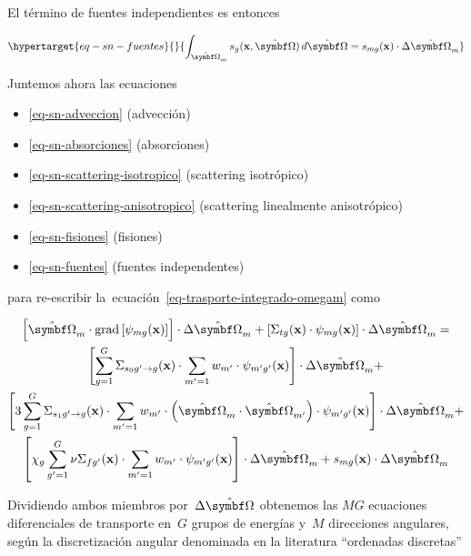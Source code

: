 \documentclass[
  12pt,
  a4paper,
  table]{scrbook}
\providecommand{\tightlist}{%
  \setlength{\itemsep}{0pt}\setlength{\parskip}{0pt}}\usepackage{longtable,booktabs,array}
\theoremstyle{plain}
\theoremstyle{definition}
\theoremstyle{plain}
\theoremstyle{plain}
\theoremstyle{remark}
\begin{document}
El término de fuentes independientes es entonces

\begin{equation}\protect\hypertarget{eq-sn-fuentes}{}{
\int_{\omegaversor_m} s_g(\vec{x}, \omegaversor) \, d\omegaversor
=
s_{mg}(\vec{x}) \cdot \Delta \omegaversor_m
}\label{eq-sn-fuentes}\end{equation}

Juntemos ahora las ecuaciones

\begin{itemize}
\tightlist
\item
  \ref{eq-sn-adveccion} (advección)
\item
  \ref{eq-sn-absorciones} (absorciones)
\item
  \ref{eq-sn-scattering-isotropico}
  (\foreignlanguage{american}{scattering} isotrópico)
\item
  \ref{eq-sn-scattering-anisotropico}
  (\foreignlanguage{american}{scattering} linealmente anisotrópico)
\item
  \ref{eq-sn-fisiones} (fisiones)
\item
  \ref{eq-sn-fuentes} (fuentes independentes)
\end{itemize}

para re-escribir la~ecuación~\ref{eq-trasporte-integrado-omegam} como

\[
\begin{gathered}
\left[ \omegaversor_m \cdot \text{grad} \left[ \psi_{mg}(\vec{x}) \right] \right]  \cdot \Delta \omegaversor_m +
\left[ \Sigma_{t g}(\vec{x}) \cdot \psi_{mg}(\vec{x}) \right] \cdot \Delta \omegaversor_m = \\
\left[ \sum_{g=1}^G \Sigma_{s_0 g^\prime \rightarrow g}(\vec{x})  \cdot \sum_{m^\prime=1} w_{m^\prime} \cdot \psi_{m^\prime g^\prime}(\vec{x}) \right] \cdot \Delta \omegaversor_m + \\
\left[ 3 \sum_{g=1}^G \Sigma_{s_1 g^\prime \rightarrow g}(\vec{x}) \cdot \sum_{m^\prime=1} w_{m^\prime} \cdot \left( \omegaversor_{m} \cdot \omegaversor_{m^\prime} \right) \cdot \psi_{m^\prime g^\prime}(\vec{x}) \right] \cdot  \Delta \omegaversor_m + \\
\left[ \chi_g \sum_{g^\prime=1}^G \nu\Sigma_{fg^\prime}(\vec{x}) \cdot   \sum_{m^\prime=1} w_{m^\prime} \cdot \psi_{m^\prime g^\prime}(\vec{x}) \right] \cdot \Delta \omegaversor_m + 
s_{mg}(\vec{x}) \cdot \Delta \omegaversor_m
\end{gathered}
\]

Dividiendo ambos miembros por~\(\Delta \omegaversor\) obtenemos las
\(MG\) ecuaciones diferenciales de transporte en~\(G\) grupos de
energías y~\(M\) direcciones angulares, según la discretización angular
denominada en la literatura ``ordenadas discretas''
\end{document}
